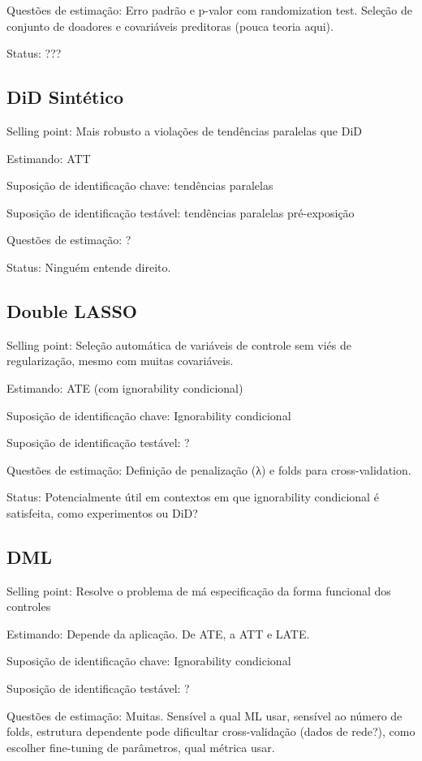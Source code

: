 \documentclass[
]{article}
\begin{document}
Questões de estimação: Erro padrão e p-valor com randomization test. Seleção de conjunto de doadores e covariáveis preditoras (pouca teoria aqui).

Status: ???

\subsection{DiD Sintético}\label{did-sintuxe9tico}

Selling point: Mais robusto a violações de tendências paralelas que DiD

Estimando: ATT

Suposição de identificação chave: tendências paralelas

Suposição de identificação testável: tendências paralelas pré-exposição

Questões de estimação: ?

Status: Ninguém entende direito.

\subsection{Double LASSO}\label{double-lasso-1}

Selling point: Seleção automática de variáveis de controle sem viés de regularização, mesmo com muitas covariáveis.

Estimando: ATE (com ignorability condicional)

Suposição de identificação chave: Ignorability condicional

Suposição de identificação testável: ?

Questões de estimação: Definição de penalização (λ) e folds para cross-validation.

Status: Potencialmente útil em contextos em que ignorability condicional é satisfeita, como experimentos ou DiD?

\subsection{DML}\label{dml-1}

Selling point: Resolve o problema de má especificação da forma funcional dos controles

Estimando: Depende da aplicação. De ATE, a ATT e LATE.

Suposição de identificação chave: Ignorability condicional

Suposição de identificação testável: ?

Questões de estimação: Muitas. Sensível a qual ML usar, sensível ao número de folds, estrutura dependente pode dificultar cross-validação (dados de rede?), como escolher fine-tuning de parâmetros, qual métrica usar.
\end{document}
